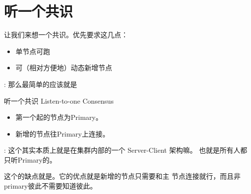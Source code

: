
\section{听一个共识}
让我们来想一个共识。优先要求这几点：
\begin{itemize}
\item 单节点可跑
\item 可（相对方便地）动态新增节点
\end{itemize}
 : 那么最简单的应该就是
\begin{myBox}{听一个共识 Listen-to-one Consensus}
  \label{cons-a}
  \begin{itemize}
  \item 第一个起的节点为Primary。
  \item 新增的节点往Primary上连接。
  \end{itemize}
\end{myBox}

 : 这个其实本质上就是在集群内部的一个 Server-Client 架构嘛。
也就是所有人都只听Primary的。
\begin{center}
\end{center}
这个的缺点就是。它的优点就是新增的节点只需要和主
节点连接就行，而且非primary彼此不需要知道彼此。

